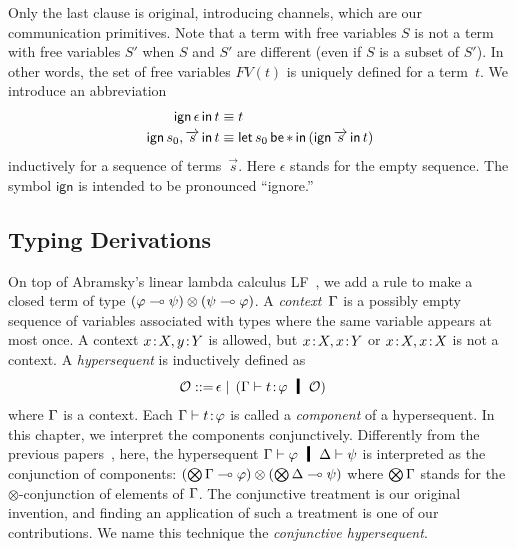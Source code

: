 Only the last clause is original,
introducing channels, which are our communication primitives.
Note that a term with free variables $S$ is not a term with free
variables $S'$ when $S$ and $S'$ are different (even if $S$ is a subset
of $S'$).
In other words, the set of free variables $FV(t)$ is uniquely defined
for a term~$t$.
We introduce an abbreviation
\begin{align*}
 \mathsf{ign }\,{\epsilon}\,\mathsf{ in }\,{t}   & \equiv t\\
 \mathsf{ign }\,{s_0,\overrightarrow s}\,\mathsf{ in }\,{t} & \equiv \mathsf{let }\,{s_0}\,\mathsf{ be }\,{\ast}\,\mathsf{ in }\,{(\mathsf{ign }\,{\overrightarrow s}\,\mathsf{ in }\,{t})}
\end{align*}
inductively for a sequence of terms~$\vec s$.
Here $\epsilon$ stands for the empty sequence.
The symbol $\mathsf{ign}$ is intended to be pronounced ``ignore.''

\subsection{Typing Derivations}

On top of Abramsky's linear lambda calculus
LF~\citep{abramsky1993computational}, we add a rule to
make a closed term of type $(\varphi\multimap\psi)\otimes(\psi\multimap\varphi)$.
A \textit{context}~$\Gamma$ is a possibly empty sequence of
variables associated with
types where the same variable appears at most once.
A context ${x} \mathord{\colon\kern -2pt}{X}, {y} \mathord{\colon\kern -2pt}{Y}$ is allowed, but ${x} \mathord{\colon\kern -2pt}{X}, {x} \mathord{\colon\kern -2pt}{Y}$
or ${x} \mathord{\colon\kern -2pt}{X},{x} \mathord{\colon\kern -2pt}{X}$ is not a context.
A \textit{hypersequent} is inductively defined as
\begin{align*}
 \hypert ::=\, & \epsilon
 \mid\, (\G\tr\tj{t}{\phi}\hmid \hypert)
\end{align*}
where $\Gamma$ is a context.
Each $\Gamma\vdash{t} \mathord{\colon\kern -2pt}{\varphi}$ is called a \textit{component}
of a hypersequent.
In this chapter, we interpret the components conjunctively.
Differently from the previous
papers~\citep{avron91,Baaz01122003,avrontableau,avron96},
here, the hypersequent $\G\tr\phi\hmid \D\tr\psi$ is interpreted as the
conjunction of components:
$(\bigotimes\Gamma\multimap\varphi)\otimes (\bigotimes\Delta\multimap\psi)$ where
$\bigotimes\Gamma$ stands for the $\otimes$-conjunction of elements of $\Gamma$.
The conjunctive treatment is our original invention, and finding an application
of such a treatment is one of our contributions.
We name this technique the \textit{conjunctive
hypersequent}.

